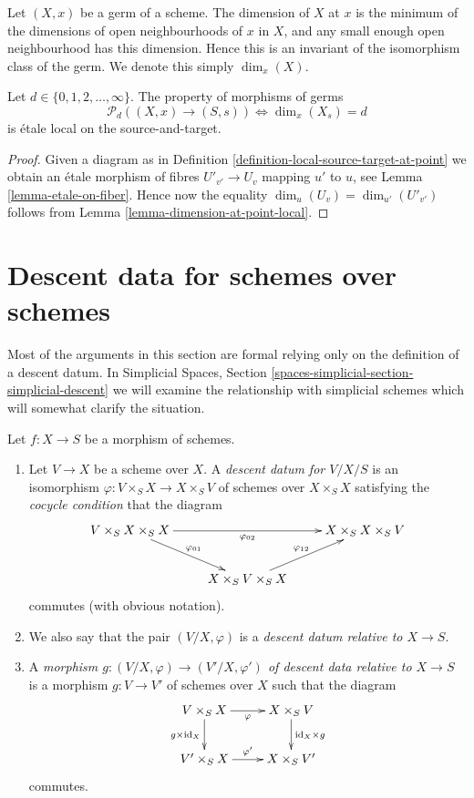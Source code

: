 \noindent
Let $(X, x)$ be a germ of a scheme.
The dimension of $X$ at $x$ is the minimum of the dimensions of
open neighbourhoods of $x$ in $X$, and any small enough open neighbourhood
has this dimension. Hence this is an invariant of the isomorphism class
of the germ. We denote this simply $\dim_x(X)$.

\begin{lemma}
\label{lemma-dimension-at-point}
Let $d \in \{0, 1, 2, \ldots, \infty\}$.
The property of morphisms of germs
$$
\mathcal{P}_d((X, x) \to (S, s))
\Leftrightarrow
\dim_x (X_s) = d
$$
is \'etale local on the source-and-target.
\end{lemma}

\begin{proof}
Given a diagram as in
Definition \ref{definition-local-source-target-at-point}
we obtain an \'etale morphism of fibres
$U'_{v'} \to U_v$ mapping $u'$ to $u$, see
Lemma \ref{lemma-etale-on-fiber}.
Hence now the equality $\dim_u(U_v) = \dim_{u'}(U'_{v'})$ follows from
Lemma \ref{lemma-dimension-at-point-local}.
\end{proof}







\section{Descent data for schemes over schemes}
\label{section-descent-datum}

\noindent
Most of the arguments in this section are formal relying only
on the definition of a descent datum. In
Simplicial Spaces, Section \ref{spaces-simplicial-section-simplicial-descent}
we will examine the relationship with simplicial schemes which will
somewhat clarify the situation.

\begin{definition}
\label{definition-descent-datum}
Let $f : X \to S$ be a morphism of schemes.
\begin{enumerate}
\item Let $V \to X$ be a scheme over $X$.
A {\it descent datum for $V/X/S$} is an isomorphism
$\varphi : V \times_S X \to X \times_S V$ of schemes over
$X \times_S X$ satisfying the {\it cocycle condition}
that the diagram
$$
\xymatrix{
V \times_S X \times_S X \ar[rd]^{\varphi_{01}} \ar[rr]_{\varphi_{02}} &
&
X \times_S X \times_S V\\
&
X \times_S V \times_S X \ar[ru]^{\varphi_{12}}
}
$$
commutes (with obvious notation).
\item We also say that the pair $(V/X, \varphi)$ is
a {\it descent datum relative to $X \to S$}.
\item A {\it morphism $g : (V/X, \varphi) \to (V'/X, \varphi')$ of
descent data relative to $X \to S$} is a morphism
$g : V \to V'$ of schemes over $X$ such that
the diagram
$$
\xymatrix{
V \times_S X \ar[r]_{\varphi} \ar[d]_{g \times \text{id}_X} &
X \times_S V \ar[d]^{\text{id}_X \times g} \\
V' \times_S X \ar[r]^{\varphi'} & X \times_S V'
}
$$
commutes.
\end{enumerate}
\end{definition}

